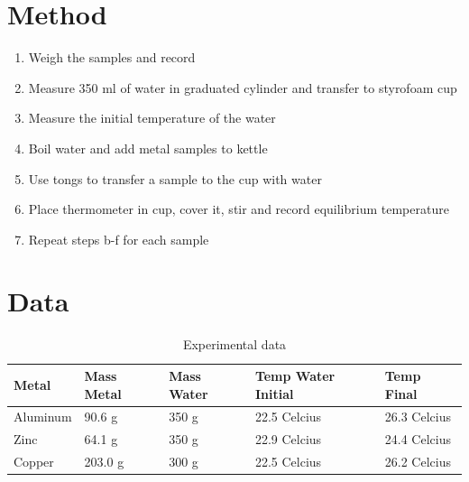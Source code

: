 \documentclass{article}
\begin{document}
\section{Method}

\begin{enumerate}
\item Weigh the samples and record
\item Measure 350 ml of water in graduated cylinder and transfer to styrofoam cup
\item Measure the initial temperature of the water
\item Boil water and add metal samples to kettle
\item Use tongs to transfer a sample to the cup with water
\item Place thermometer in cup, cover it, stir and record equilibrium temperature
\item Repeat steps b-f for each sample

\end{enumerate}

\newpage

\section{Data}

\begin{table}[htbp]
\begin{center}
\footnotesize
\begin{tabular}{lllll}
\toprule
 Metal   & Mass Metal & Mass Water & Temp Water Initial & Temp Final \\                                                      
\midrule
  
    Aluminum   & 90.6 g  &350 g         & 22.5 Celcius & 26.3 Celcius   \\
    Zinc   & 64.1 g    &350 g       & 22.9 Celcius  & 24.4 Celcius  \\
    Copper     & 203.0 g    & 300 g       & 22.5 Celcius & 26.2 Celcius  \\
    
\bottomrule
\end{tabular}
\end{center}
  \caption{Experimental data}
  \label{tab:font-sizes}
\end{table}
\end{document}
